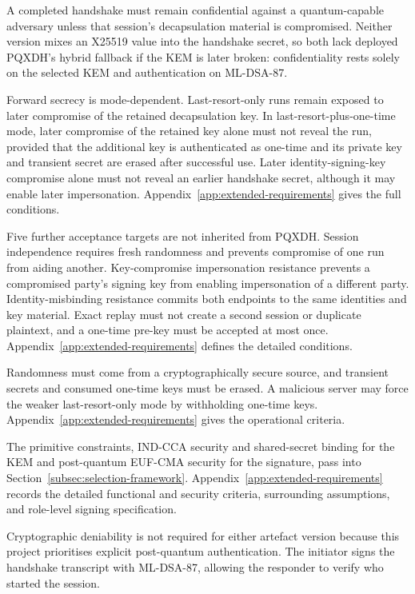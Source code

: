 A completed handshake must remain confidential against a quantum-capable adversary unless that session's decapsulation material is compromised. Neither version mixes an X25519 value into the handshake secret, so both lack deployed PQXDH's hybrid fallback if the KEM is later broken: confidentiality rests solely on the selected KEM and authentication on ML-DSA-87.

Forward secrecy is mode-dependent. Last-resort-only runs remain exposed to later compromise of the retained decapsulation key. In last-resort-plus-one-time mode, later compromise of the retained key alone must not reveal the run, provided that the additional key is authenticated as one-time and its private key and transient secret are erased after successful use. Later identity-signing-key compromise alone must not reveal an earlier handshake secret, although it may enable later impersonation. Appendix~\ref{app:extended-requirements} gives the full conditions.

Five further acceptance targets are not inherited from PQXDH. Session independence requires fresh randomness and prevents compromise of one run from aiding another. Key-compromise impersonation resistance prevents a compromised party's signing key from enabling impersonation of a different party. Identity-misbinding resistance commits both endpoints to the same identities and key material. Exact replay must not create a second session or duplicate plaintext, and a one-time pre-key must be accepted at most once. Appendix~\ref{app:extended-requirements} defines the detailed conditions.

Randomness must come from a cryptographically secure source, and transient secrets and consumed one-time keys must be erased. A malicious server may force the weaker last-resort-only mode by withholding one-time keys. Appendix~\ref{app:extended-requirements} gives the operational criteria.

The primitive constraints, IND-CCA security and shared-secret binding for the KEM and post-quantum EUF-CMA security for the signature, pass into Section~\ref{subsec:selection-framework}. Appendix~\ref{app:extended-requirements} records the detailed functional and security criteria, surrounding assumptions, and role-level signing specification.

Cryptographic deniability is not required for either artefact version because this project prioritises explicit post-quantum authentication. The initiator signs the handshake transcript with ML-DSA-87, allowing the responder to verify who started the session.


